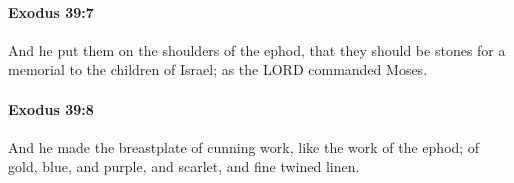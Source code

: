 		\paragraph{Exodus 39:7} %
			\label{EXODUS-39-7}

			And he put them on the shoulders of the ephod, that they should be stones for a memorial to the children of Israel; as the LORD commanded Moses.


		\paragraph{Exodus 39:8} %
			\label{EXODUS-39-8}

			And he made the breastplate of cunning work, like the work of the ephod; of gold, blue, and purple, and scarlet, and fine twined linen.


